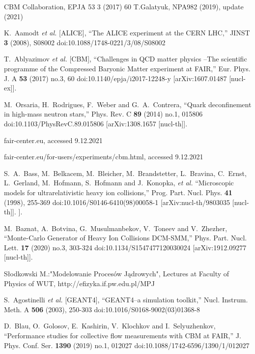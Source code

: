 \begin{thebibliography}{99}
    CBM Collaboration, EPJA 53 3 (2017) 60
    T.Galatyuk, NPA982 (2019), update (2021)
    
    K.~Aamodt \textit{et al.} [ALICE],
    ``The ALICE experiment at the CERN LHC,''
    JINST \textbf{3} (2008), S08002
    doi:10.1088/1748-0221/3/08/S08002
    
    T.~Ablyazimov \textit{et al.} [CBM],
    ``Challenges in QCD matter physics --The scientific programme of the Compressed Baryonic Matter experiment at FAIR,''
    Eur. Phys. J. A \textbf{53} (2017) no.3, 60
    doi:10.1140/epja/i2017-12248-y
    [arXiv:1607.01487 [nucl-ex]].
    
    M.~Orsaria, H.~Rodrigues, F.~Weber and G.~A.~Contrera,
    ``Quark deconfinement in high-mass neutron stars,''
    Phys. Rev. C \textbf{89} (2014) no.1, 015806
    doi:10.1103/PhysRevC.89.015806
    [arXiv:1308.1657 [nucl-th]].
    
    fair-center.eu, accessed 9.12.2021
    
    fair-center.eu/for-users/experiments/cbm.html, accessed 9.12.2021
    
   S.~A.~Bass, M.~Belkacem, M.~Bleicher, M.~Brandstetter, L.~Bravina, C.~Ernst, L.~Gerland, M.~Hofmann, S.~Hofmann and J.~Konopka, \textit{et al.}
    ``Microscopic models for ultrarelativistic heavy ion collisions,''
    Prog. Part. Nucl. Phys. \textbf{41} (1998), 255-369
    doi:10.1016/S0146-6410(98)00058-1
    [arXiv:nucl-th/9803035 [nucl-th]].
    ].
    
    M.~Baznat, A.~Botvina, G.~Musulmanbekov, V.~Toneev and V.~Zhezher,
    ``Monte-Carlo Generator of Heavy Ion Collisions DCM-SMM,''
    Phys. Part. Nucl. Lett. \textbf{17} (2020) no.3, 303-324
    doi:10.1134/S1547477120030024
    [arXiv:1912.09277 [nucl-th]].
    
    Słodkowski M.:"Modelowanie Procesów Jądrowych", Lectures at Faculty of Physics of WUT, http://efizyka.if.pw.edu.pl/MPJ
    
    
    S.~Agostinelli \textit{et al.} [GEANT4],
    ``GEANT4--a simulation toolkit,''
    Nucl. Instrum. Meth. A \textbf{506} (2003), 250-303
    doi:10.1016/S0168-9002(03)01368-8
    
    D.~Blau, O.~Golosov, E.~Kashirin, V.~Klochkov and I.~Selyuzhenkov,
    ``Performance studies for collective flow measurements with CBM at FAIR,''
    J. Phys. Conf. Ser. \textbf{1390} (2019) no.1, 012027
    doi:10.1088/1742-6596/1390/1/012027
    

\end{thebibliography}
